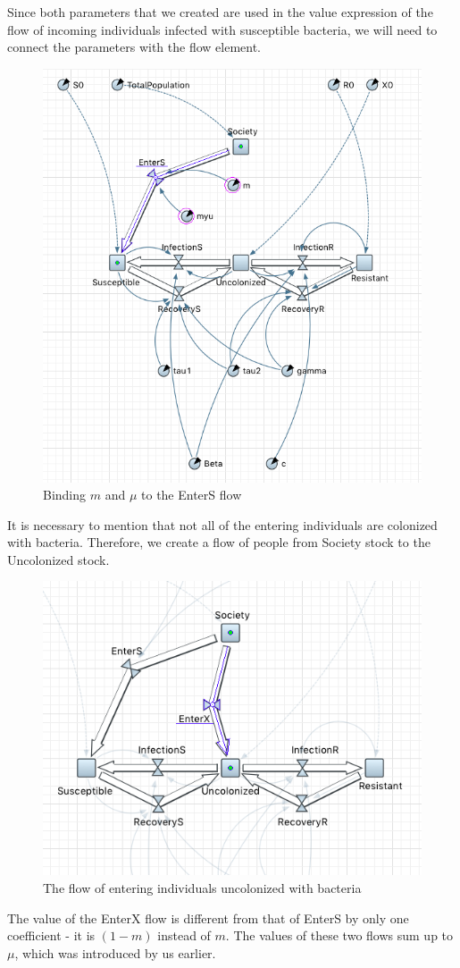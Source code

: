 Since both parameters that we created are used in the value expression of the flow of incoming individuals infected with susceptible bacteria, we will need to connect the parameters with the flow element.

\begin{figure}[H]
  \centering
  \includegraphics[height=0.6\textwidth]{img/screens/society/society8}
  \caption{Binding $m$ and $\mu$ to the EnterS flow}
\end{figure}

It is necessary to mention that not all of the entering individuals are colonized with bacteria. Therefore, we create a flow of people from Society stock to the Uncolonized stock.

\begin{figure}[H]
  \centering
  \includegraphics[height=0.5\textwidth]{img/screens/society/society9}
  \caption{The flow of entering individuals uncolonized with bacteria}
\end{figure}

The value of the EnterX flow is different from that of EnterS by only one coefficient - it is $(1 - m)$ instead of $m$. The values of these two flows sum up to $\mu$, which was introduced by us earlier.

